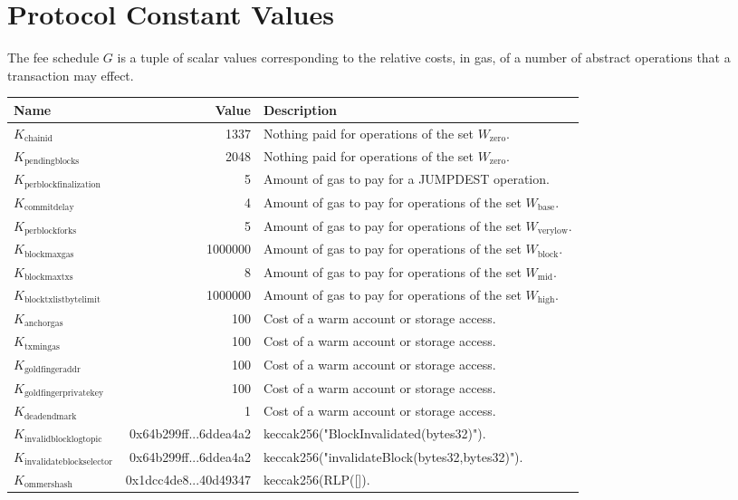 \documentclass[9pt,oneside]{amsart}
\begin{document}
\section{Protocol Constant Values}\label{app:fees}

\nopagebreak
The fee schedule $G$ is a tuple of scalar values corresponding to the relative costs, in gas, of a number of abstract operations that a transaction may effect.

\nopagebreak
\begin{tabu}{l r l}
\toprule
Name & Value & Description \\
\midrule
$K_{\mathrm{chainid}}$ & 1337 & Nothing paid for operations of the set {\small $W_{\mathrm{zero}}$}. \\
$K_{\mathrm{pendingblocks}}$ & 2048 & Nothing paid for operations of the set {\small $W_{\mathrm{zero}}$}. \\
$K_{\mathrm{perblockfinalization}}$ & 5 & Amount of gas to pay for a {\small JUMPDEST} operation. \\
$K_{\mathrm{commitdelay}}$ & 4 & Amount of gas to pay for operations of the set {\small $W_{\mathrm{base}}$}. \\
$K_{\mathrm{perblockforks}}$ & 5 & Amount of gas to pay for operations of the set {\small $W_{\mathrm{verylow}}$}. \\
$K_{\mathrm{blockmaxgas}}$ & 1000000 & Amount of gas to pay for operations of the set {\small $W_{\mathrm{block}}$}. \\
$K_{\mathrm{blockmaxtxs}}$ & 8 & Amount of gas to pay for operations of the set {\small $W_{\mathrm{mid}}$}. \\
$K_{\mathrm{blocktxlistbytelimit}}$ & 1000000 & Amount of gas to pay for operations of the set {\small $W_{\mathrm{high}}$}. \\
$K_{\mathrm{anchorgas}}$ & 100 & Cost of a warm account or storage access. \\
$K_{\mathrm{txmingas}}$ & 100 & Cost of a warm account or storage access. \\
$K_{\mathrm{goldfingeraddr}}$ & 100 & Cost of a warm account or storage access. \\
$K_{\mathrm{goldfingerprivatekey}}$ & 100 & Cost of a warm account or storage access. \\
$K_{\mathrm{deadendmark}}$ & 1 & Cost of a warm account or storage access. \\
$K_{\mathrm{invalidblocklogtopic}}$ & 0x64b299ff...6ddea4a2 & keccak256("BlockInvalidated(bytes32)"). \\
$K_{\mathrm{invalidateblockselector}}$ & 0x64b299ff...6ddea4a2 & keccak256("invalidateBlock(bytes32,bytes32)"). \\
$K_{\mathrm{ommershash}}$ & 0x1dcc4de8...40d49347 & keccak256(RLP([]). \\
\bottomrule
\end{tabu}
\end{document}
